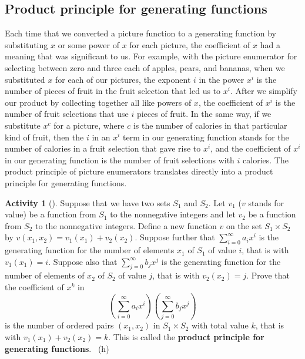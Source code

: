 \documentclass[10pt,]{book}
\newcommand{\terminology}[1]{\textbf{#1}}
\theoremstyle{plain}
\theoremstyle{definition}
\theoremstyle{definition}
\theoremstyle{definition}
\newtheorem{activity}[project]{Activity}
\numberwithin{equation}{chapter}
\begin{document}
\subsection[{Product principle for generating functions}]{Product principle for generating functions}\label{subsection-34}
\hypertarget{p-1297}{}%
Each time that we converted a picture function to a generating function by substituting \(x\) or some power of \(x\) for each picture, the coefficient of \(x\) had a meaning that was significant to us. For example, with the picture enumerator for selecting between zero and three each of apples, pears, and bananas, when we substituted \(x\) for each of our pictures, the exponent \(i\) in the power \(x^i\) is the number of pieces of fruit in the fruit selection that led us to \(x^i\). After we simplify our product by collecting together all like powers of \(x\), the coefficient of \(x^i\) is the number of fruit selections that use \(i\) pieces of fruit. In the same way, if we substitute \(x^c\) for a picture, where \(c\) is the number of calories in that particular kind of fruit, then the \(i\) in an \(x^i\) term in our generating function stands for the number of calories in a fruit selection that gave rise to \(x^i\), and the coefficient of \(x^i\) in our generating function is the number of fruit selections with \(i\) calories.  The product principle of picture enumerators translates directly into a product principle for generating functions.%
\begin{activity}[]\label{ProductPrincipleOGF}
\hypertarget{p-1298}{}%
Suppose that we have two sets \(S_1\) and \(S_2\). Let \(v_1\) (\(v\) stands for value) be a function from \(S_1\) to the nonnegative integers and let \(v_2\) be a function from \(S_2\) to the nonnegative integers.  Define a new function \(v\) on the set \(S_1 \times S_2\) by \(v(x_1,x_2) = v_1(x_1) +v_2(x_2)\). Suppose further that \(\sum_{i=0}^\infty a_ix^i\) is the generating function for the number of elements \(x_1\) of \(S_1\) of value \(i\), that is with \(v_1(x_1)=i\). Suppose also that \(\sum_{j=0}^\infty b_j x^j\) is the generating function for the number of elements of \(x_2\) of \(S_2\) of value \(j\), that is with \(v_2(x_2) = j\).  Prove that the coefficient of \(x^k\) in%
\begin{equation*}
\left(\sum_{i=0}^\infty a_ix^i\right)\left(\sum_{j=0}^\infty
b_jx^j\right)
\end{equation*}
is the number of ordered pairs \((x_1,x_2)\) in \(S_1\times S_2\) with total value \(k\), that is with \(v_1(x_1) +v_2(x_2) =k\). This is called the \terminology{product principle for generating functions}.%
~{\tiny (h)}\end{activity}
\end{document}
